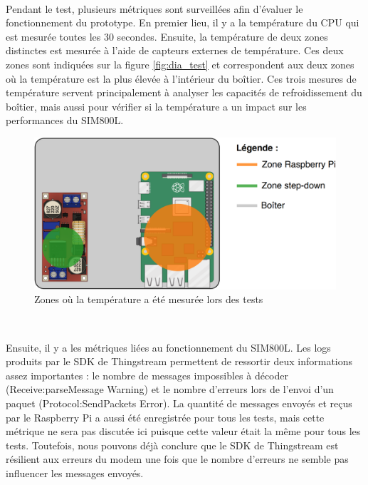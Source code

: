 ~

\vspace{-0.5cm}

\noindent
Pendant le test, plusieurs métriques sont surveillées afin d'évaluer le fonctionnement du prototype. En premier lieu, il y a la température du CPU qui est mesurée toutes les 30 secondes. Ensuite, la température de deux zones distinctes est mesurée à l'aide de capteurs externes de température. Ces deux zones sont indiquées sur la figure \ref{fig:dia_test} et correspondent aux deux zones où la température est la plus élevée à l'intérieur du boîtier. Ces trois mesures de température servent principalement à analyser les capacités de refroidissement du boîtier, mais aussi pour vérifier si la température a un impact sur les performances du SIM800L.

\begin{figure}[ht!]
  \centering
  \includegraphics[scale=0.25]{img/el_prototype/zones_temperature.png}
  \caption{Zones où la température a été mesurée lors des tests}
  \label{fig:temp_zones}
\end{figure}

~

\noindent
Ensuite, il y a les métriques liées au fonctionnement du SIM800L.
Les logs produits par le SDK de Thingstream permettent de ressortir deux informations assez importantes : le nombre de messages impossibles à décoder (Receive:parseMessage Warning) et le nombre d'erreurs lors de l'envoi d'un paquet (Protocol:SendPackets Error). La quantité de messages envoyés et reçus par le Raspberry Pi a aussi été enregistrée pour tous les tests, mais cette métrique ne sera pas discutée ici puisque cette valeur était la même pour tous les tests. Toutefois, nous pouvons déjà conclure que le SDK de Thingstream est résilient aux erreurs du modem une fois que le nombre d'erreurs ne semble pas influencer les messages envoyés.

